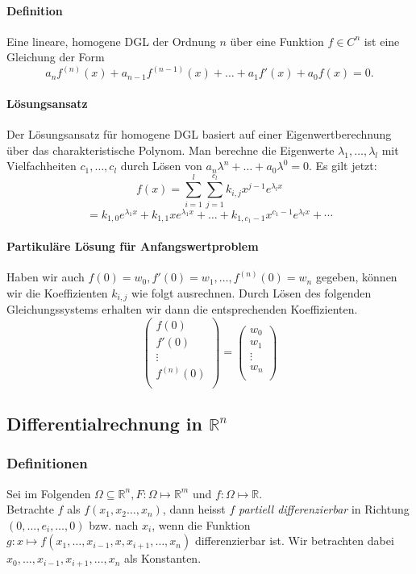 \documentclass[a4paper, 9pt, DIV=24]{scrartcl}
\newcommand{\R}{\mathbb{R}}
\begin{document}
\paragraph{Definition} Eine lineare, homogene DGL der Ordnung $n$ über eine Funktion $f \in C^{n}$ ist eine Gleichung der Form
\[ a_n f^{(n)}(x) + a_{n-1} f^{(n-1)}(x) + \dots + a_1 f'(x) + a_0 f(x) = 0. \]
\paragraph{Lösungsansatz}
Der Lösungsansatz für homogene DGL basiert auf einer Eigenwertberechnung über das charakteristische Polynom.
Man berechne die Eigenwerte $\lambda_1, \dots, \lambda_l$ mit Vielfachheiten $c_1, \dots, c_l$ durch Lösen von $a_n\lambda^n + \dots + a_0\lambda^0 = 0$.
Es gilt jetzt:
\[ f(x) = \sum_{i=1}^{l}\sum_{j=1}^{c_l}k_{i,j}x^{j-1}e^{\lambda_l x} \]
\[ = k_{1,0}e^{\lambda_1 x} + k_{1,1}xe^{\lambda_1 x} + \dots + k_{1,c_1-1}x^{c_1-1}e^{\lambda_l x} + \cdots \]
\paragraph{Partikuläre Lösung für Anfangswertproblem}
Haben wir auch $f(0) = w_0, f'(0) = w_1, \dots, f^{(n)}(0) = w_n$ gegeben,
können wir die Koeffizienten $k_{i,j}$ wie folgt ausrechnen.
Durch Lösen des folgenden Gleichungssystems erhalten wir dann die entsprechenden Koeffizienten.
\[
 \begin{pmatrix}
  f(0) \\
  f'(0) \\
  \vdots \\
  f^{(n)}(0) \\
 \end{pmatrix}
  =
 \begin{pmatrix}
  w_0 \\
  w_1 \\
  \vdots \\
  w_n \\
 \end{pmatrix}
\]

\clearpage
\subsection{Differentialrechnung in $\mathbb{R}^n$}
\subsubsection{Definitionen}
Sei im Folgenden $\Omega \subseteq \R^n, F: \Omega \mapsto \R^m$ und $f: \Omega \mapsto \R$. \\
Betrachte $f$ als $f(x_1,x_2\dots,x_n)$, dann heisst $f$ \emph{partiell differenzierbar} in Richtung $(0,\dots,e_i,\dots,0)$ bzw. nach $x_i$,
wenn die Funktion $g: x \mapsto f(x_1,\dots,x_{i-1},x,x_{i+1},\dots,x_n)$ differenzierbar ist. Wir betrachten dabei $x_0,\dots,x_{i-1},x_{i+1},\dots,x_n$ als Konstanten.
\end{document}
